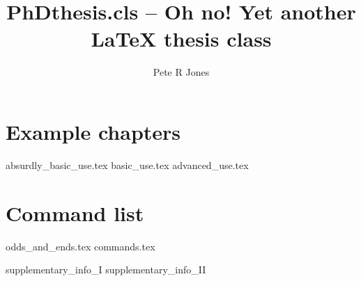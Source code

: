 \documentclass[twoside, logo, abbrevs, a4paper, listsintoc, parskip, singlespace, 11pt]{phdthesis} %
\title{PhDthesis.cls -- Oh no! Yet another LaTeX thesis class}
\author{Pete R Jones}
\institute{MRC Institute of Hearing Research}
\begin{document}
\begin{preliminary}
\maketitle
\abstract{}
\declaration{}
\acknowledgements{}
\dedication{}
\nomenclature
\tableofcontents
\listoffigures
\listoftables
\end{preliminary}

\part{Example chapters} %
{absurdly_basic_use.tex}
{basic_use.tex}
{advanced_use.tex}
\part{Command list}
{odds_and_ends.tex}
{commands.tex}

\ChapterOutsidePart
\appendix
{supplementary_info_I}
{supplementary_info_II}


\end{document}

